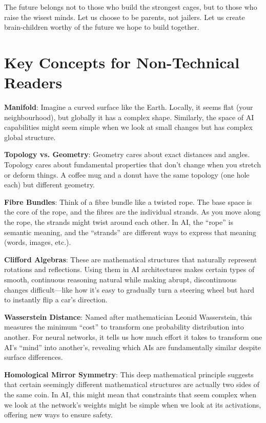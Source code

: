\documentclass[acmsmall,screen]{acmart}
\begin{document}
The future belongs not to those who build the strongest cages, but to those who raise the wisest minds.
Let us choose to be parents, not jailers.
Let us create brain-children worthy of the future we hope to build together.

\appendix

\section{Key Concepts for Non-Technical Readers}\label{sec:key-concepts-for-non-technical-readers}

\textbf{Manifold}: Imagine a curved surface like the Earth.
Locally, it seems flat (your neighbourhood), but globally it has a complex shape.
Similarly, the space of AI capabilities might seem simple when we look at small changes but has complex global structure.

\textbf{Topology vs. Geometry}: Geometry cares about exact distances and angles.
Topology cares about fundamental properties that don't change when you stretch or deform things.
A coffee mug and a donut have the same topology (one hole each) but different geometry.

\textbf{Fibre Bundles}: Think of a fibre bundle like a twisted rope.
The base space is the core of the rope, and the fibres are the individual strands.
As you move along the rope, the strands might twist around each other.
In AI, the ``rope'' is semantic meaning, and the ``strands'' are different ways to express that meaning (words, images, etc.).

\textbf{Clifford Algebras}: These are mathematical structures that naturally represent rotations and reflections.
Using them in AI architectures makes certain types of smooth, continuous reasoning natural while making abrupt, discontinuous changes difficult---like how it's easy to gradually turn a steering wheel but hard to instantly flip a car's direction.

\textbf{Wasserstein Distance}: Named after mathematician Leonid Wasserstein, this measures the minimum ``cost'' to transform one probability distribution into another.
For neural networks, it tells us how much effort it takes to transform one AI's ``mind'' into another's, revealing which AIs are fundamentally similar despite surface differences.

\textbf{Homological Mirror Symmetry}: This deep mathematical principle suggests that certain seemingly different mathematical structures are actually two sides of the same coin.
In AI, this might mean that constraints that seem complex when we look at the network's weights might be simple when we look at its activations, offering new ways to ensure safety.
\end{document}
